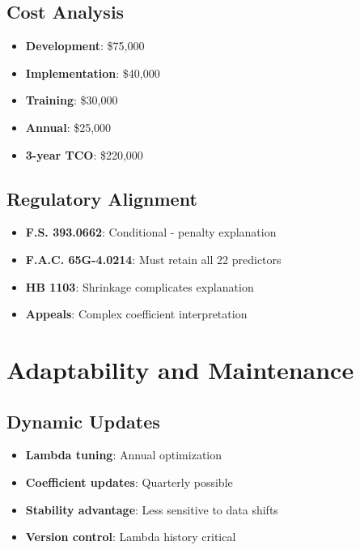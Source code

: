 \subsection{Cost Analysis}

\begin{itemize}
    \item \textbf{Development}: \$75,000
    \item \textbf{Implementation}: \$40,000
    \item \textbf{Training}: \$30,000
    \item \textbf{Annual}: \$25,000
    \item \textbf{3-year TCO}: \$220,000
\end{itemize}

\subsection{Regulatory Alignment}

\begin{itemize}
    \item[\yellowwarning] \textbf{F.S. 393.0662}:   Conditional - penalty explanation
    \item[\yellowwarning] \textbf{F.A.C. 65G-4.0214}:   Must retain all 22 predictors
    \item[\yellowwarning] \textbf{HB 1103}:   Shrinkage complicates explanation
    \item[\yellowwarning] \textbf{Appeals}:   Complex coefficient interpretation
\end{itemize}

\section{Adaptability and Maintenance}

\subsection{Dynamic Updates}

\begin{itemize}
    \item \textbf{Lambda tuning}: Annual optimization
    \item \textbf{Coefficient updates}: Quarterly possible
    \item \textbf{Stability advantage}: Less sensitive to data shifts
    \item \textbf{Version control}: Lambda history critical
\end{itemize}

